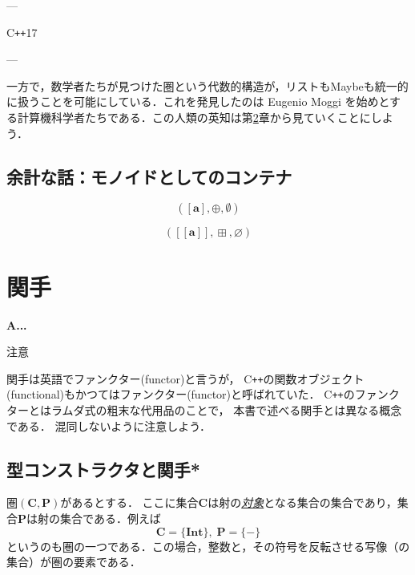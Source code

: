 \documentclass[a5paper,draft]{jsbook}
\def\[{\left[\!\left[}
\def\]{\right]\!\right]}
\newcommand{\programminglanguage}[1]{\textsf{#1}}
\newcommand{\cxx}{\programminglanguage{C}\texttt{++}}
\newenvironment{leader}{\begingroup\bf}{\endgroup}
\newenvironment{caution}{\begin{boxnote}\begin{center}注意\end{center}}{\end{boxnote}}
\newcommand{\keyword}[1]{{\underline{\emph{#1}}}}
\newcommand{\mathSet}[1]{\mathbf{#1}} %
\newcommand{\mathTypeParameter}[1]{\mathbf{#1}}
\newcommand{\mathTypeName}[1]{\textbf{#1}}
\newcommand{\mathListType}[1]{\left[#1\right]}
\newcommand{\mathAppend}{\oplus}
\newcommand{\mathCategoryShort}[2]{(#1,#2)}
\newcommand{\mathMonoid}[3]{(#1,#2,#3)}
\DeclareMathOperator{\hsklMap}{\odot}
\DeclareMathOperator{\hsklMaybeAppend}{\boxplus}
\newcommand{\hsklEmptyList}{\emptyset}
\newcommand{\hsklNothing}{\varnothing}
\newcommand{\hsklMaybeType}[1]{\[#1\]}
\begin{document}
---

\cxx17

---

一方で，数学者たちが見つけた圏という代数的構造が，リストもMaybeも統一的に扱うことを可能にしている．これを発見したのは Eugenio Moggi を始めとする計算機科学者たちである．この人類の英知は第\ref{ch:functor}章から見ていくことにしよう．


\section{余計な話：モノイドとしてのコンテナ}

$$\mathMonoid{\mathListType{\mathTypeParameter{a}}}{\mathAppend}{\hsklEmptyList}$$

$$\mathMonoid{\hsklMaybeType{\mathTypeParameter{a}}}{\hsklMaybeAppend}{\hsklNothing}$$


\chapter{関手}
\label{ch:functor}

\begin{leader}
A...
\end{leader}

\begin{caution}
関手は英語でファンクター(functor)と言うが，
\cxx の関数オブジェクト(functional)もかつてはファンクター(functor)と呼ばれていた．
\cxx のファンクターとはラムダ式の粗末な代用品のことで，
本書で述べる関手とは異なる概念である．
混同しないように注意しよう．
\end{caution}


\section{型コンストラクタと関手*}

圏$\mathCategoryShort{\mathSet{C}}{\mathSet{P}}$があるとする．
ここに集合$\mathSet{C}$は射の\keyword{対象}となる集合の集合であり，集合$\mathSet{P}$は射の集合である．例えば$$\mathSet{C}=\{\mathTypeName{Int}\},\;\mathSet{P}=\{-\}$$というのも圏の一つである．この場合，整数と，その符号を反転させる写像（の集合）が圏の要素である．

\end{document}
